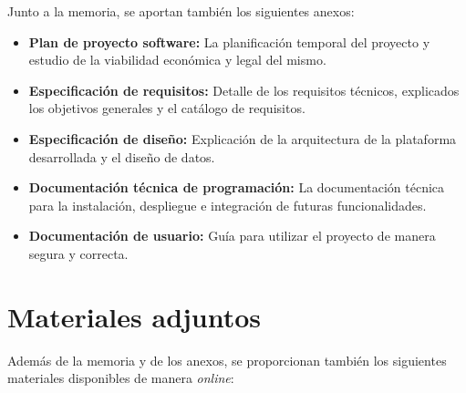 Junto a la memoria, se aportan también los siguientes anexos:

\begin{itemize}
    \item \textbf{Plan de proyecto software:} La planificación temporal del proyecto y estudio de la viabilidad económica y legal del mismo.
    \item \textbf{Especificación de requisitos:} Detalle de los requisitos técnicos, explicados los objetivos generales y el catálogo de requisitos.
    \item \textbf{Especificación de diseño:} Explicación de la arquitectura de la plataforma desarrollada y el diseño de datos.
    \item \textbf{Documentación técnica de programación:} La documentación técnica para la instalación, despliegue e integración de futuras funcionalidades.
    \item \textbf{Documentación de usuario:} Guía para utilizar el proyecto de manera segura y correcta.
\end{itemize}

\section{Materiales adjuntos}

Además de la memoria y de los anexos, se proporcionan también los siguientes materiales disponibles de manera \textit{online}:


